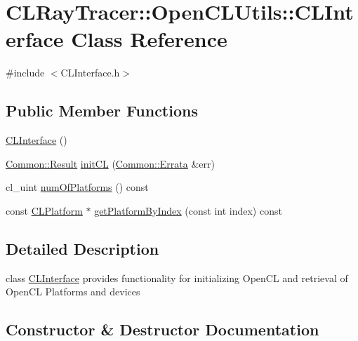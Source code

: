 \hypertarget{class_c_l_ray_tracer_1_1_open_c_l_utils_1_1_c_l_interface}{}\section{C\+L\+Ray\+Tracer\+:\+:Open\+C\+L\+Utils\+:\+:C\+L\+Interface Class Reference}
\label{class_c_l_ray_tracer_1_1_open_c_l_utils_1_1_c_l_interface}


{\ttfamily \#include $<$C\+L\+Interface.\+h$>$}

\subsection*{Public Member Functions}
\begin{DoxyCompactItemize}
\item 
\hyperlink{class_c_l_ray_tracer_1_1_open_c_l_utils_1_1_c_l_interface_abb053408e3b3c14ee5fae46ae5b35a99}{C\+L\+Interface} ()
\item 
\hyperlink{_errata_8h_a389396702f1aff6e71eb21328b0775c1}{Common\+::\+Result} \hyperlink{class_c_l_ray_tracer_1_1_open_c_l_utils_1_1_c_l_interface_a8a1291f633475c8ac0741f003779b49f}{init\+CL} (\hyperlink{class_c_l_ray_tracer_1_1_common_1_1_errata}{Common\+::\+Errata} \&err)
\item 
cl\+\_\+uint \hyperlink{class_c_l_ray_tracer_1_1_open_c_l_utils_1_1_c_l_interface_a9e64a480f2c7cfcec67876574957fb6e}{num\+Of\+Platforms} () const 
\item 
const \hyperlink{class_c_l_ray_tracer_1_1_open_c_l_utils_1_1_c_l_platform}{C\+L\+Platform} $\ast$ \hyperlink{class_c_l_ray_tracer_1_1_open_c_l_utils_1_1_c_l_interface_aedaeb0bc1cdc1b41fd39282a3270bf39}{get\+Platform\+By\+Index} (const int index) const 
\end{DoxyCompactItemize}


\subsection{Detailed Description}
class \hyperlink{class_c_l_ray_tracer_1_1_open_c_l_utils_1_1_c_l_interface}{C\+L\+Interface} provides functionality for initializing Open\+CL and retrieval of Open\+CL Platforms and devices 

\subsection{Constructor \& Destructor Documentation}
